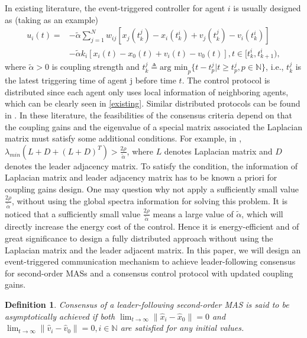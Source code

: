 \documentclass[review]{elsarticle}
\newtheorem{defi}{Definition}
\begin{document}
In existing literature, the event-triggered controller for agent $i$ is usually designed as (taking \cite{Zhao2017Event} as an example)
\begin{equation}\label{existing}
\begin{split}
u_i(t) =&  - \tilde\alpha \sum_{j=1}^{N}w_{ij} \left[  {x}_j (t_k^j)-{x}_i (t_k^i)+ {v}_j (t_k^j)-{v}_i (t_k^i) \right]\\ 
& -\tilde\alpha k_i  \left[ {x}_i (t) - {x}_0 (t) + {v}_i (t) - {v}_0 (t)\right], t\in [t_k^i,t_{k+1}^i ),
\end{split}
\end{equation}
where $\tilde{\alpha}>0$ is coupling strength and $t_k^j \triangleq \text{arg~min}_p \{t-t_p^j|t\geq t_p^j,p\in \mathbb{N}\}$, i.e., $t_k^j$ is the latest triggering time of agent j before time $t$. The control protocol is distributed since each agent only uses local information of neighboring agents, which can be clearly seen in \eqref{existing}. Similar distributed protocols can be found in \cite{Xie2015Event,Zhu2014Event,Li2015Event,Guo2014A}. In these literature, the feasibilities of the consensus criteria depend on that the coupling gains and the eigenvalue of a special matrix associated the Laplacian matrix must satisfy some additional conditions. For example, in \cite{Zhao2017Event}, $\lambda_{min} (L+D+(L+D)^T)>\frac{2\rho}{\tilde{\alpha}}$, where $L$ denotes Laplacian matrix and $D$ denotes the leader adjacency matrix. To satisfy the condition, the information of Laplacian matrix and leader adjacency matrix has to be known a priori for coupling gains design. 
One may question why not apply a sufficiently small value $\frac{2\rho}{\tilde\alpha}$, without using the global spectra information for solving this problem. It is noticed that a sufficiently small value $\frac{2\rho}{\tilde\alpha}$ means a large value of $\tilde\alpha$, which will directly increase the energy cost of the control. 
Hence it is energy-efficient and of great significance to design a fully distributed approach without using the Laplacian matrix and the leader adjacent matrix. In this paper, we will design an event-triggered communication mechanism to achieve leader-following consensus for second-order MASs and a consensus control protocol with updated coupling gains.

\begin{defi}
	Consensus of a leader-following second-order MAS is said to be asymptotically achieved if both $\lim_{t\rightarrow \infty}\|\hat x_i - \hat{x}_0\| = 0$ and   $\lim_{t\rightarrow \infty}\|\hat v_i - \hat{v}_0\| = 0, i \in \mathbb{N}$ are satisfied for any initial values.  
\end{defi}
\end{document}
